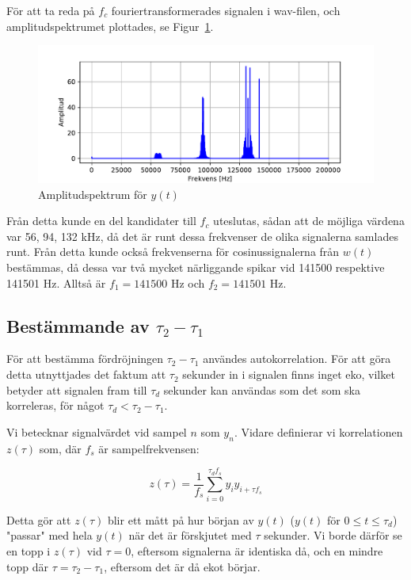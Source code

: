 \documentclass[10pt,twocolumn]{article}
\begin{document}
För att ta reda på $f_c$ fouriertransformerades signalen i wav-filen, och
amplitudspektrumet plottades, se Figur~\ref{fig:yamp}. 
\begin{figure}[h]
    \centering
    \includegraphics[width=\linewidth]{figures/yamp.pdf}
    \caption{Amplitudspektrum för $y(t)$}\label{fig:yamp}
\end{figure}
Från detta kunde en del kandidater till $f_c$ uteslutas, sådan att
de möjliga värdena var 56, 94, 132 kHz, då det är runt dessa frekvenser de
olika signalerna samlades runt. Från detta kunde också frekvenserna för
cosinussignalerna från $w(t)$
bestämmas, då dessa var två mycket närliggande spikar vid 141500 respektive
141501 Hz. Alltså är $f_1=141500$ Hz och $f_2=141501$ Hz.

\subsection{Bestämmande av $\tau_2 - \tau_1$}
För att bestämma fördröjningen $\tau_2 - \tau_1$ användes autokorrelation. För
att göra detta utnyttjades det faktum att $\tau_2$ sekunder in i signalen
finns inget eko, vilket betyder att signalen fram till $\tau_d$
sekunder kan användas som det som ska korreleras, för något $\tau_d < \tau_2 - \tau_1$.

Vi betecknar signalvärdet vid sampel $n$ som $y_n$. Vidare definierar vi korrelationen
$z(\tau)$ som, där $f_s$ är sampelfrekvensen:

\begin{equation*}
    z(\tau) = \frac{1}{f_s}\sum_{i=0}^{\tau_d f_s}y_iy_{i + \tau f_s}
\end{equation*}

Detta gör att $z(\tau)$ blir ett mått på hur början av $y(t)$ ($y(t)$ för $0
\leq t \leq \tau_d$)
"passar" med hela $y(t)$ när det är förskjutet med $\tau$ sekunder. Vi
borde därför se en topp i $z(\tau)$ vid $\tau = 0$, eftersom signalerna är identiska då, och en mindre topp där $\tau
= \tau_2 - \tau_1$, eftersom det är då ekot börjar.
\end{document}
